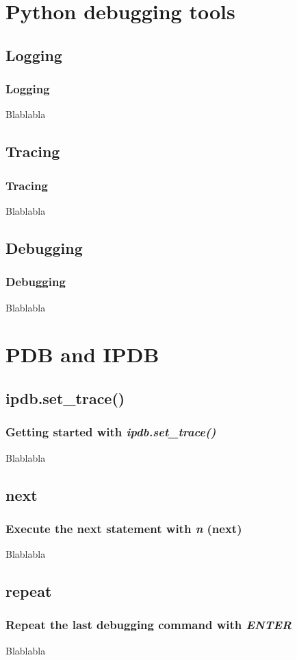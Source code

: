 \section{Python debugging tools}

\subsection{Logging}
\begin{frame}
\frametitle{Logging}	
Blablabla
\end{frame}

\subsection{Tracing}
\begin{frame}
\frametitle{Tracing}	
Blablabla
\end{frame}

\subsection{Debugging}
\begin{frame}
\frametitle{Debugging}	
Blablabla
\end{frame}





\section{PDB and IPDB}

\subsection{ipdb.set\_trace()}
\begin{frame}
\frametitle{Getting started with \textit{\textbf{ipdb.set\_trace()}}}
Blablabla
\end{frame}

\subsection{next}
\begin{frame}
\frametitle{Execute the next statement with \textit{\textbf{n}} (next)}
Blablabla
\end{frame}

\subsection{repeat}
\begin{frame}
\frametitle{Repeat the last debugging command with \textit{\textbf{ENTER}}}
Blablabla
\end{frame}

